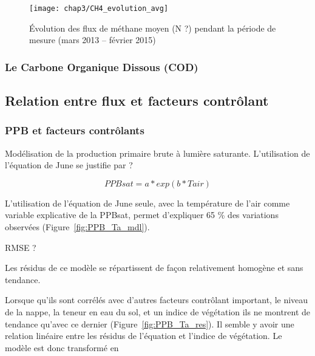 
\begin{figure}
\centering
\texttt{[image: chap3/CH4\_evolution\_avg]}
\caption{Évolution des flux de méthane moyen (N ?) pendant la période de mesure (mars 2013 -- février 2015)}
\label{fig:CH4_evolution_avg}
\end{figure}

\subsubsection{Le Carbone Organique Dissous (COD)}


\subsection{Relation entre flux et facteurs contrôlant}

\subsubsection{PPB et facteurs contrôlants}

Modélisation de la production primaire brute à lumière saturante.
L'utilisation de l'équation de June se justifie par ?

\begin{equation}
PPBsat = a*exp(b*Tair)
\end{equation}

L'utilisation de l'équation de June seule, avec la température de l'air comme variable explicative de la PPBsat, permet d'expliquer 65 \% des variations observées (Figure~\ref{fig:PPB_Ta_mdl}).

RMSE ?

Les résidus de ce modèle se répartissent de façon relativement homogène et sans tendance.

Lorsque qu'ils sont corrélés avec d'autres facteurs contrôlant important, le niveau de la nappe, la teneur en eau du sol, et un indice de végétation ils ne montrent de tendance qu'avec ce dernier (Figure~\ref{fig:PPB_Ta_res}).
Il semble y avoir une relation linéaire entre les résidus de l'équation et l'indice de végétation.
Le modèle est donc transformé en 

